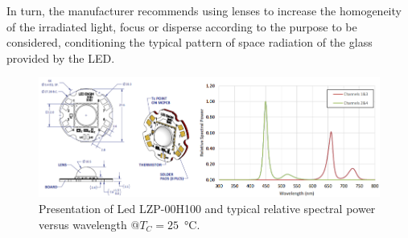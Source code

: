 \documentclass[letterpaper,12pt,twoside]{articleingud}
\begin{document}
In turn, the manufacturer recommends using lenses to increase the homogeneity of the irradiated light, focus or disperse according to the purpose to be considered, conditioning the typical pattern of space radiation of the glass provided by the LED.
\begin{figure}
 \begin{center}
  \includegraphics[width=16cm]{images/ledEngine.png}
   \caption{Presentation of Led LZP-00H100 and typical relative spectral power versus wavelength $@T_C = 25$~\si{\degreeCelsius}.\cite{ledEngine} }
  \end{center}
\end{figure}
\end{document}
